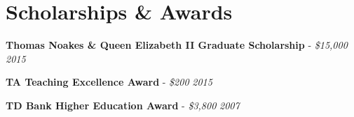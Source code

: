 \section{\sc Scholarships \& Awards}

\textbf{Thomas Noakes \& Queen Elizabeth II Graduate Scholarship} - {\em \$15,000} \hfill {\em 2015}

\textbf{TA Teaching Excellence Award} - {\em \$200} \hfill {\em 2015}


\textbf{TD Bank Higher Education Award} - {\em \$3,800} \hfill {\em 2007}
